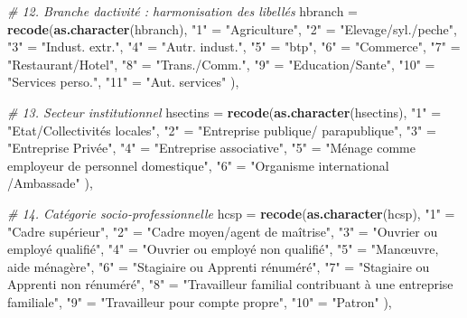 \documentclass[
]{article}
\newenvironment{Shaded}{\begin{snugshade}}{\end{snugshade}}
\newcommand{\AttributeTok}[1]{\textcolor[rgb]{0.13,0.29,0.53}{#1}}
\newcommand{\CommentTok}[1]{\textcolor[rgb]{0.56,0.35,0.01}{\textit{#1}}}
\newcommand{\FunctionTok}[1]{\textcolor[rgb]{0.13,0.29,0.53}{\textbf{#1}}}
\newcommand{\NormalTok}[1]{#1}
\newcommand{\OtherTok}[1]{\textcolor[rgb]{0.56,0.35,0.01}{#1}}
\newcommand{\StringTok}[1]{\textcolor[rgb]{0.31,0.60,0.02}{#1}}
\begin{document}
\begin{Shaded}
\begin{Highlighting}[]
    \CommentTok{\# 12. Branche d\textquotesingle{}activité : harmonisation des libellés}
    \AttributeTok{hbranch =} \FunctionTok{recode}\NormalTok{(}\FunctionTok{as.character}\NormalTok{(hbranch),}
      \StringTok{"1"}  \OtherTok{=} \StringTok{"Agriculture"}\NormalTok{,}
      \StringTok{"2"}  \OtherTok{=} \StringTok{"Elevage/syl./peche"}\NormalTok{,}
      \StringTok{"3"}  \OtherTok{=} \StringTok{"Indust. extr."}\NormalTok{,}
      \StringTok{"4"}  \OtherTok{=} \StringTok{"Autr. indust."}\NormalTok{,}
      \StringTok{"5"}  \OtherTok{=} \StringTok{"btp"}\NormalTok{,}
      \StringTok{"6"}  \OtherTok{=} \StringTok{"Commerce"}\NormalTok{,}
      \StringTok{"7"}  \OtherTok{=} \StringTok{"Restaurant/Hotel"}\NormalTok{,}
      \StringTok{"8"}  \OtherTok{=} \StringTok{"Trans./Comm."}\NormalTok{,}
      \StringTok{"9"}  \OtherTok{=} \StringTok{"Education/Sante"}\NormalTok{,}
      \StringTok{"10"} \OtherTok{=} \StringTok{"Services perso."}\NormalTok{,}
      \StringTok{"11"} \OtherTok{=} \StringTok{"Aut. services"}
\NormalTok{    ),}
    
    \CommentTok{\# 13. Secteur institutionnel}
    \AttributeTok{hsectins =} \FunctionTok{recode}\NormalTok{(}\FunctionTok{as.character}\NormalTok{(hsectins),}
      \StringTok{"1"} \OtherTok{=} \StringTok{"Etat/Collectivités locales"}\NormalTok{,}
      \StringTok{"2"} \OtherTok{=} \StringTok{"Entreprise publique/ parapublique"}\NormalTok{,}
      \StringTok{"3"} \OtherTok{=} \StringTok{"Entreprise Privée"}\NormalTok{,}
      \StringTok{"4"} \OtherTok{=} \StringTok{"Entreprise associative"}\NormalTok{,}
      \StringTok{"5"} \OtherTok{=} \StringTok{"Ménage comme employeur de personnel domestique"}\NormalTok{,}
      \StringTok{"6"} \OtherTok{=} \StringTok{"Organisme international /Ambassade"}
\NormalTok{    ),}
    
    \CommentTok{\# 14. Catégorie socio{-}professionnelle}
    \AttributeTok{hcsp =} \FunctionTok{recode}\NormalTok{(}\FunctionTok{as.character}\NormalTok{(hcsp),}
      \StringTok{"1"}  \OtherTok{=} \StringTok{"Cadre supérieur"}\NormalTok{,}
      \StringTok{"2"}  \OtherTok{=} \StringTok{"Cadre moyen/agent de maîtrise"}\NormalTok{,}
      \StringTok{"3"}  \OtherTok{=} \StringTok{"Ouvrier ou employé qualifié"}\NormalTok{,}
      \StringTok{"4"}  \OtherTok{=} \StringTok{"Ouvrier ou employé non qualifié"}\NormalTok{,}
      \StringTok{"5"}  \OtherTok{=} \StringTok{"Manœuvre, aide ménagère"}\NormalTok{,}
      \StringTok{"6"}  \OtherTok{=} \StringTok{"Stagiaire ou Apprenti rénuméré"}\NormalTok{,}
      \StringTok{"7"}  \OtherTok{=} \StringTok{"Stagiaire ou Apprenti non rénuméré"}\NormalTok{,}
      \StringTok{"8"}  \OtherTok{=} \StringTok{"Travailleur familial contribuant à une entreprise familiale"}\NormalTok{,}
      \StringTok{"9"}  \OtherTok{=} \StringTok{"Travailleur pour compte propre"}\NormalTok{,}
      \StringTok{"10"} \OtherTok{=} \StringTok{"Patron"}
\NormalTok{    ),}
    

\end{Highlighting}
\end{Shaded}
\end{document}

